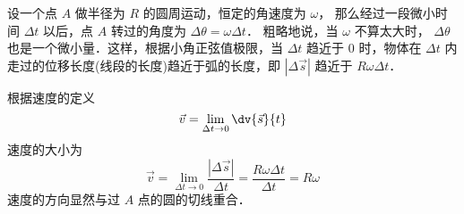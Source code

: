 

设一个点 $A$ 做半径为 $R$ 的圆周运动，恒定的角速度为 $\omega $， 那么经过一段微小时间 $\Delta t$ 以后，点 $A$ 转过的角度为 $\Delta \theta  = \omega \Delta t$． 粗略地说，当 $\omega $ 不算太大时， $\Delta \theta $ 也是一个微小量．这样，根据小角正弦值极限，当 $\Delta t$ 趋近于 $0$ 时，物体在 $\Delta t$ 内走过的位移长度(线段的长度)趋近于弧的长度，即 $\left| {\Delta \vec s} \right|$ 趋近于 $R\omega \Delta t$． 

根据速度的定义 
\begin{equation}
\vec v = \lim_{\Delta t \to 0} \dv{\vec s}{t}
\end{equation}
速度的大小为
\begin{equation}
\vec v = \lim_{\Delta t \to 0} \frac{\left| {\Delta \vec s} \right|}{\Delta t} = \frac{R\omega \Delta t}{\Delta t} = R\omega 
\end{equation}
速度的方向显然与过 $A$ 点的圆的切线重合．











